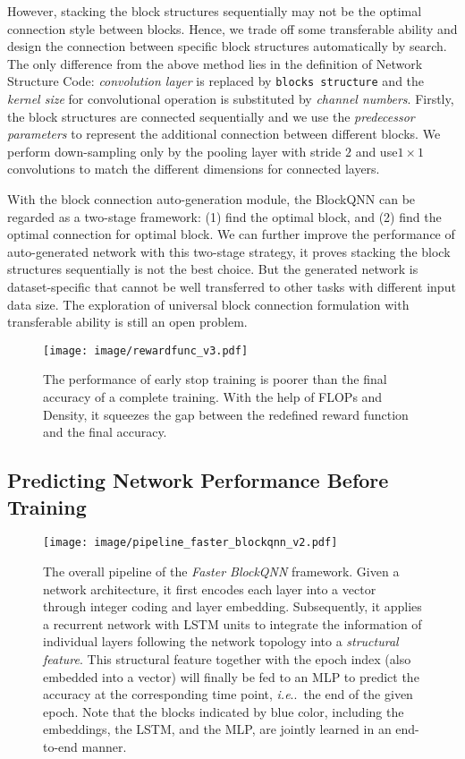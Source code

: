 \documentclass[10pt,journal,compsoc]{IEEEtran}
\makeatletter
\DeclareRobustCommand\onedot{\futurelet\@let@token\@onedot}
\def\@onedot{\ifx\@let@token.\else.\null\fi\xspace}
\def\ie{\emph{i.e}\onedot} \def\Ie{\emph{I.e}\onedot}
\makeatother
\begin{document}
However, stacking the block structures sequentially may not be the optimal connection style between blocks. Hence, we trade off some transferable ability and design the connection between specific block structures automatically by search. The only difference from the above method lies in the definition of Network Structure Code: \textit{convolution layer} is replaced by \texttt{blocks structure} and the \textit{kernel size} for convolutional operation is substituted by \textit{channel numbers}. Firstly, the block structures are connected sequentially and we use the \textit{predecessor parameters} to represent the additional connection between different blocks. We perform down-sampling only by the pooling layer with stride $2$ and use$1\times1$ convolutions to match the different dimensions for connected layers. 

With the block connection auto-generation module, the BlockQNN can be regarded as a two-stage framework: (1) find the optimal block, and (2) find the optimal connection for optimal block. We can further improve the performance of auto-generated network with this two-stage strategy, it proves stacking the block structures sequentially is not the best choice. But the generated network is dataset-specific that cannot be well transferred to other tasks with different input data size. The exploration of universal block connection formulation with transferable ability is still an open problem. 


\begin{figure}[tbp]
	\centering
	\texttt{[image: image/rewardfunc\_v3.pdf]}
	\caption{The performance of early stop training is poorer than the final accuracy of a complete training. With the help of FLOPs and Density, it squeezes the gap between the redefined reward function and the final accuracy.}
	\label{fig:early_stop}
\end{figure}


\subsection{Predicting Network Performance Before Training}
\label{subsec:predict_network_prf}


\begin{figure*}[t]
	\begin{center}
		\texttt{[image: image/pipeline\_faster\_blockqnn\_v2.pdf]}
	\end{center}
	\caption{\small
		The overall pipeline of the \emph{Faster BlockQNN} framework.
		Given a network architecture, it first encodes each layer into
		a vector through integer coding and layer embedding.
		Subsequently, it applies a recurrent network with LSTM units to
		integrate the information of individual layers following the
		network topology into a \emph{structural feature}.
		This structural feature together with the epoch index (also embedded
		into a vector) will finally be fed to an MLP to predict
		the accuracy at the corresponding time point, \ie~the end of the
		given epoch.
		Note that the blocks indicated by blue color,
		including the embeddings, the LSTM, and the MLP,
		are jointly learned in an end-to-end manner.
	}
	\label{fig:overview}
\end{figure*}
\end{document}
